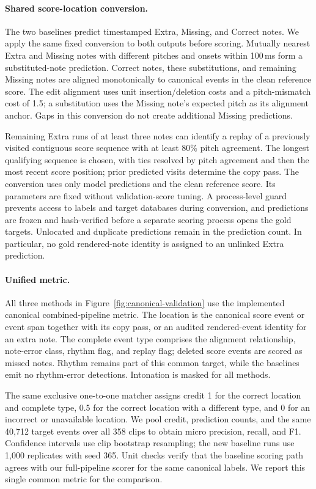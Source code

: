 \paragraph{Shared score-location conversion.}
The two baselines predict timestamped Extra, Missing, and Correct notes.
We apply the same fixed conversion to both outputs before scoring. Mutually
nearest Extra and Missing notes with different pitches and onsets within
100\,ms form a substituted-note prediction. Correct notes, these substitutions,
and remaining Missing notes are aligned monotonically to canonical events in
the clean reference score. The edit alignment uses unit insertion/deletion
costs and a pitch-mismatch cost of 1.5; a substitution uses the Missing note's
expected pitch as its alignment anchor. Gaps in this conversion do not create
additional Missing predictions.

Remaining Extra runs of at least three notes can identify a replay of a
previously visited contiguous score sequence with at least 80\% pitch
agreement. The longest qualifying sequence is chosen, with ties resolved by
pitch agreement and then the most recent score position; prior predicted
visits determine the copy pass. The conversion uses only model predictions
and the clean reference score. Its parameters are fixed without validation-score
tuning. A process-level guard prevents access to labels and target databases
during conversion, and predictions are frozen and hash-verified before a
separate scoring process opens the gold targets. Unlocated and duplicate
predictions remain in the prediction count. In particular, no gold rendered-note
identity is assigned to an unlinked Extra prediction.

\paragraph{Unified metric.}
All three methods in Figure~\ref{fig:canonical-validation} use the implemented
canonical combined-pipeline metric. The location is the canonical score event
or event span together with its copy pass, or an audited rendered-event
identity for an extra note. The complete event type comprises the alignment
relationship, note-error class, rhythm flag, and replay flag; deleted score
events are scored as missed notes. Rhythm remains part of this common target,
while the baselines emit no rhythm-error detections. Intonation is masked for
all methods.

The same exclusive one-to-one matcher assigns credit 1 for the correct location
and complete type, 0.5 for the correct location with a different type, and 0
for an incorrect or unavailable location. We pool credit, prediction counts,
and the same 40,712 target events over all 358 clips to obtain micro precision,
recall, and F1. Confidence intervals use clip bootstrap resampling; the new
baseline runs use 1,000 replicates with seed 365. Unit checks verify that the
baseline scoring path agrees with our full-pipeline scorer for the same
canonical labels. We report this single common metric for the comparison.

